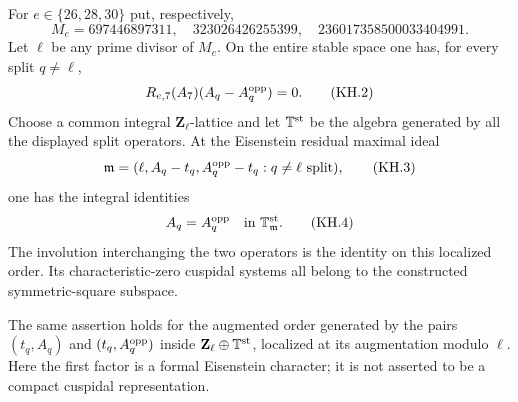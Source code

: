 \begin{proposition}
For $e\in\{26,28,30\}$ put, respectively,
\[
 M_e=697446897311,\quad323026426255399,\quad
      236017358500033404991.
                                                               \tag{KH.1}
\]
Let $\ell$ be any prime divisor of $M_e$.  On the entire stable
space one has, for every split $q\ne\ell$,
\[
 R_{e,7}(A_7)(A_q-A_q^{\rm opp})=0.                         \tag{KH.2}
\]
Choose a common integral $\mathbf Z_\ell$-lattice and let
$\mathbb T^{\rm st}$ be the algebra generated by all the displayed
split operators.  At the Eisenstein residual maximal ideal
\[
 \mathfrak m=(\ell,A_q-t_q,A_q^{\rm opp}-t_q:q\ne\ell
                   \text{ split}),                        \tag{KH.3}
\]
one has the integral identities
\[
         A_q=A_q^{\rm opp}\quad\hbox{in }
                       \mathbb T^{\rm st}_{\mathfrak m}.  \tag{KH.4}
\]
The involution interchanging the two operators is the identity
on this localized order.  Its characteristic-zero cuspidal
systems all belong to the constructed symmetric-square subspace.

The same assertion holds for the augmented order generated by
the pairs $(t_q,A_q)$ and $(t_q,A_q^{\rm opp})$ inside
$\mathbf Z_\ell\oplus\mathbb T^{\rm st}$, localized at its
augmentation modulo $\ell$.  Here the first factor is a formal
Eisenstein character; it is not asserted to be a compact
cuspidal representation.
\end{proposition}
